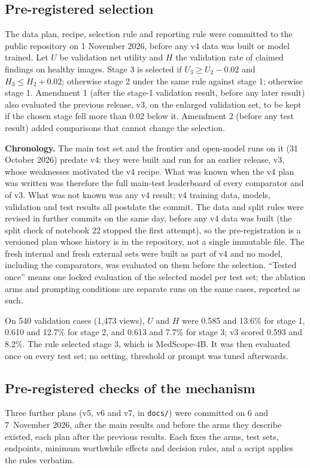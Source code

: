\documentclass[11pt]{article}
\begin{document}
\subsection{Pre-registered selection}\label{sec:select}
The data plan, recipe, selection rule and reporting rule were committed to the public repository on 1 November 2026, before any v4 data was built or model trained. Let $U$ be validation net utility and $H$ the validation rate of claimed findings on healthy images. Stage 3 is selected if $U_3\ge U_2-0.02$ and $H_3\le H_2+0.02$; otherwise stage 2 under the same rule against stage 1; otherwise stage 1. Amendment 1 (after the stage-1 validation result, before any later result) also evaluated the previous release, v3, on the enlarged validation set, to be kept if the chosen stage fell more than 0.02 below it. Amendment 2 (before any test result) added comparisons that cannot change the selection.

\textbf{Chronology.} The main test set and the frontier and open-model runs on it (31 October 2026) predate v4: they were built and run for an earlier release, v3, whose weaknesses motivated the v4 recipe. What was known when the v4 plan was written was therefore the full main-test leaderboard of every comparator and of v3. What was not known was any v4 result; v4 training data, models, validation and test results all postdate the commit. The data and split rules were revised in further commits on the same day, before any v4 data was built (the split check of notebook 22 stopped the first attempt), so the pre-registration is a versioned plan whose history is in the repository, not a single immutable file. The fresh internal and fresh external sets were built as part of v4 and no model, including the comparators, was evaluated on them before the selection. ``Tested once'' means one locked evaluation of the selected model per test set; the ablation arms and prompting conditions are separate runs on the same cases, reported as such.

On 540 validation cases (1,473 views), $U$ and $H$ were 0.585 and 13.6\% for stage 1, 0.610 and 12.7\% for stage 2, and 0.613 and 7.7\% for stage 3; v3 scored 0.593 and 8.2\%. The rule selected stage 3, which is MedScope-4B. It was then evaluated once on every test set; no setting, threshold or prompt was tuned afterwards.

\subsection{Pre-registered checks of the mechanism}\label{sec:prereg}
Three further plans (v5, v6 and v7, in \texttt{docs/}) were committed on 6 and 7~November 2026, after the main results and before the arms they describe existed, each plan after the previous results. Each fixes the arms, test sets, endpoints, minimum worthwhile effects and decision rules, and a script applies the rules verbatim.
\end{document}
